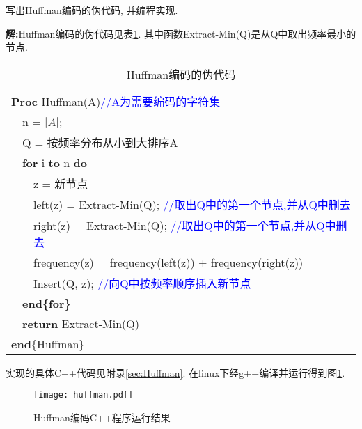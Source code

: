 \begin{problem}[习题4.4]
写出Huffman编码的伪代码, 并编程实现.
\end{problem}
\begin{solution}
\textbf{解:}Huffman编码的伪代码见表\ref{huffmanArithmetic}. 其中函数Extract-Min(Q)是从Q中取出频率最小的节点.
\begin{table}[!htb]
\centering
\caption{\label{huffmanArithmetic}Huffman编码的伪代码}
\begin{tabular}{llll}
\hline
\multicolumn{4}{l}{\textbf{Proc} Huffman(A)\textcolor{blue}{//A为需要编码的字符集}} \\
 & \multicolumn{3}{l}{n = $|A|$;} \\
 & \multicolumn{3}{l}{Q = 按频率分布从小到大排序A} \\
 & \multicolumn{3}{l}{\textbf{for} i \textbf{to} n \textbf{do}} \\
 &  & \multicolumn{2}{l}{z = 新节点} \\
 &  & \multicolumn{2}{l}{left(z) = Extract-Min(Q); \textcolor{blue}{//取出Q中的第一个节点,并从Q中删去}} \\
 &  & \multicolumn{2}{l}{right(z) = Extract-Min(Q); \textcolor{blue}{//取出Q中的第一个节点,并从Q中删去}} \\
 &  & \multicolumn{2}{l}{frequency(z) =  frequency(left(z)) + frequency(right(z))} \\
 &  & \multicolumn{2}{l}{Insert(Q, z); \textcolor{blue}{//向Q中按频率顺序插入新节点}} \\
 & \multicolumn{3}{l}{\textbf{end\{for\}}} \\
 & \multicolumn{3}{l}{\textbf{return} Extract-Min(Q)} \\
\multicolumn{4}{l}{\textbf{end}\{Huffman\}} \\
\hline
\end{tabular}
\end{table}

实现的具体C++代码见附录\ref{sec:Huffman}. 在linux下经g++编译并运行得到图\ref{huffmanResult}.
\begin{figure}[!htb]
\centering
\texttt{[image: huffman.pdf]}
\caption{\label{huffmanResult}Huffman编码C++程序运行结果}
\end{figure}

\end{solution}
